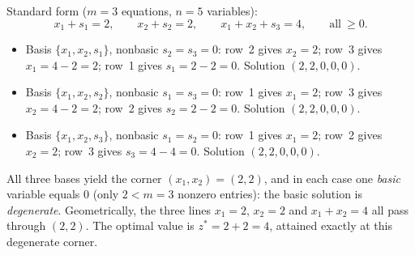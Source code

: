 \begin{solutions}
  \item Standard form ($m=3$ equations, $n=5$ variables):
        \[
          x_{1}+s_{1}=2,\qquad
          x_{2}+s_{2}=2,\qquad
          x_{1}+x_{2}+s_{3}=4,\qquad
          \text{all}\ \ge 0 .
        \]
        \begin{itemize}[leftmargin=1.8em,itemsep=0.3ex]
          \item Basis $\{x_{1},x_{2},s_{1}\}$, nonbasic $s_{2}=s_{3}=0$:
                row~2 gives $x_{2}=2$; row~3 gives $x_{1}=4-2=2$; row~1
                gives $s_{1}=2-2=0$. Solution $(2,2,0,0,0)$.
          \item Basis $\{x_{1},x_{2},s_{2}\}$, nonbasic $s_{1}=s_{3}=0$:
                row~1 gives $x_{1}=2$; row~3 gives $x_{2}=4-2=2$; row~2
                gives $s_{2}=2-2=0$. Solution $(2,2,0,0,0)$.
          \item Basis $\{x_{1},x_{2},s_{3}\}$, nonbasic $s_{1}=s_{2}=0$:
                row~1 gives $x_{1}=2$; row~2 gives $x_{2}=2$; row~3 gives
                $s_{3}=4-4=0$. Solution $(2,2,0,0,0)$.
        \end{itemize}
        All three bases yield the corner $(x_{1},x_{2})=(2,2)$, and in
        each case one \emph{basic} variable equals $0$ (only $2<m=3$
        nonzero entries): the basic solution is \emph{degenerate}.
        Geometrically, the three lines $x_{1}=2$, $x_{2}=2$ and
        $x_{1}+x_{2}=4$ all pass through $(2,2)$. The optimal value is
        $z^{*}=2+2=4$, attained exactly at this degenerate corner.
\end{solutions}
